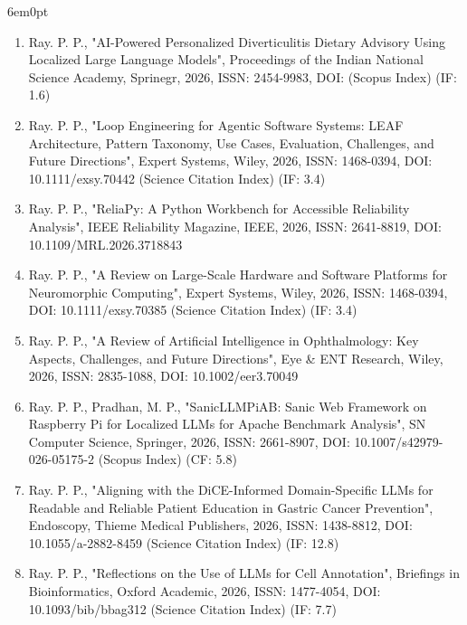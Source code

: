 \documentclass[11pt,a4paper]{moderncv}
\begin{document}
\begin{adjustwidth}{6em}{0pt}
	\begin{enumerate}
		
		
		\item Ray. P. P., "AI-Powered Personalized Diverticulitis Dietary Advisory Using Localized Large Language Models", Proceedings of the Indian National Science Academy, Sprinegr, 2026, ISSN: 2454-9983, DOI: (Scopus Index) (IF: 1.6)
		
		\item Ray. P. P., "Loop Engineering for Agentic Software Systems: LEAF Architecture, Pattern Taxonomy, Use Cases, Evaluation, Challenges, and Future Directions", Expert Systems, Wiley, 2026, ISSN: 1468-0394, DOI:  10.1111/exsy.70442 (Science Citation Index) (IF: 3.4)
		
		\item Ray. P. P., "ReliaPy: A Python Workbench for Accessible Reliability Analysis", IEEE Reliability Magazine, IEEE, 2026, ISSN: 2641-8819, DOI: 10.1109/MRL.2026.3718843

		\item Ray. P. P., "A Review on Large-Scale Hardware and Software Platforms for Neuromorphic Computing", Expert Systems, Wiley, 2026, ISSN: 1468-0394, DOI: 10.1111/exsy.70385  (Science Citation Index) (IF: 3.4) 
		
		\item Ray. P. P., "A Review of Artificial Intelligence in Ophthalmology: Key Aspects, Challenges, and Future Directions", Eye \& ENT Research, Wiley, 2026, ISSN: 2835-1088, DOI: 10.1002/eer3.70049
				
		\item Ray. P. P., Pradhan, M. P., "SanicLLMPiAB: Sanic Web Framework on Raspberry Pi for Localized LLMs for Apache Benchmark Analysis", SN Computer Science, Springer, 2026, ISSN: 2661-8907, DOI: 10.1007/s42979-026-05175-2 (Scopus Index) (CF: 5.8) 
		
		\item Ray. P. P., "Aligning with the DiCE-Informed Domain-Specific LLMs for Readable and Reliable Patient Education in Gastric Cancer Prevention", Endoscopy, Thieme Medical Publishers, 2026, ISSN: 1438-8812, DOI: 10.1055/a-2882-8459  (Science Citation Index) (IF: 12.8) 

		\item Ray. P. P., "Reflections on the Use of LLMs for Cell Annotation", Briefings in Bioinformatics, Oxford Academic, 2026, ISSN: 1477-4054, DOI: 10.1093/bib/bbag312 (Science Citation Index) (IF: 7.7) 
		

\end{enumerate}
\end{adjustwidth}
\end{document}
